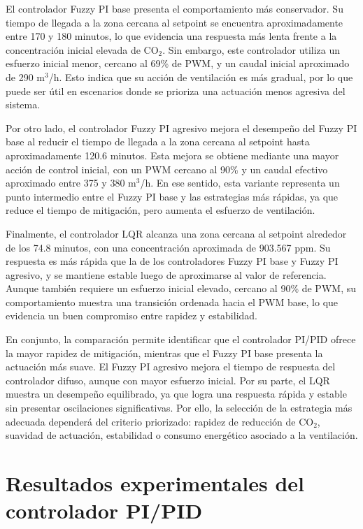 El controlador Fuzzy PI base presenta el comportamiento más conservador. Su tiempo de llegada a la zona cercana al setpoint se encuentra aproximadamente entre 170 y 180 minutos, lo que evidencia una respuesta más lenta frente a la concentración inicial elevada de CO\(_2\). Sin embargo, este controlador utiliza un esfuerzo inicial menor, cercano al 69\% de PWM, y un caudal inicial aproximado de 290 m\(^3\)/h. Esto indica que su acción de ventilación es más gradual, por lo que puede ser útil en escenarios donde se prioriza una actuación menos agresiva del sistema.

Por otro lado, el controlador Fuzzy PI agresivo mejora el desempeño del Fuzzy PI base al reducir el tiempo de llegada a la zona cercana al setpoint hasta aproximadamente 120.6 minutos. Esta mejora se obtiene mediante una mayor acción de control inicial, con un PWM cercano al 90\% y un caudal efectivo aproximado entre 375 y 380 m\(^3\)/h. En ese sentido, esta variante representa un punto intermedio entre el Fuzzy PI base y las estrategias más rápidas, ya que reduce el tiempo de mitigación, pero aumenta el esfuerzo de ventilación.

Finalmente, el controlador LQR alcanza una zona cercana al setpoint alrededor de los 74.8 minutos, con una concentración aproximada de 903.567 ppm. Su respuesta es más rápida que la de los controladores Fuzzy PI base y Fuzzy PI agresivo, y se mantiene estable luego de aproximarse al valor de referencia. Aunque también requiere un esfuerzo inicial elevado, cercano al 90\% de PWM, su comportamiento muestra una transición ordenada hacia el PWM base, lo que evidencia un buen compromiso entre rapidez y estabilidad.

En conjunto, la comparación permite identificar que el controlador PI/PID ofrece la mayor rapidez de mitigación, mientras que el Fuzzy PI base presenta la actuación más suave. El Fuzzy PI agresivo mejora el tiempo de respuesta del controlador difuso, aunque con mayor esfuerzo inicial. Por su parte, el LQR muestra un desempeño equilibrado, ya que logra una respuesta rápida y estable sin presentar oscilaciones significativas. Por ello, la selección de la estrategia más adecuada dependerá del criterio priorizado: rapidez de reducción de CO\(_2\), suavidad de actuación, estabilidad o consumo energético asociado a la ventilación.



\section{Resultados experimentales del controlador PI/PID}


